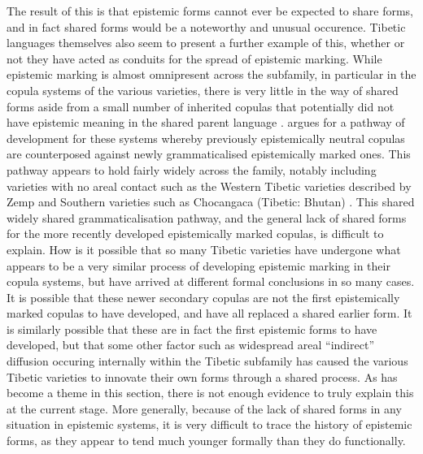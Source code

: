 The result of this is that epistemic forms cannot ever be expected to share forms, and in fact shared forms would be a noteworthy and unusual occurence. Tibetic languages themselves also seem to present a further example of this, whether or not they have acted as conduits for the spread of epistemic marking. While epistemic marking is almost omnipresent across the subfamily, in particular in the copula systems of the various varieties, there is very little in the way of shared forms aside from a small number of inherited copulas that potentially did not have epistemic meaning in the shared parent language \cites{Hill2017}{Zeisler2018}{Zemp2020}.  argues for a pathway of development for these systems whereby previously epistemically neutral copulas are counterposed against newly grammaticalised epistemically marked ones. This pathway appears to hold fairly widely across the family, notably including varieties with no areal contact such as the Western Tibetic varieties described by Zemp and Southern varieties such as Chocangaca (Tibetic: Bhutan) \cite{Bodnaruk2023a}. This shared widely shared grammaticalisation pathway, and the general lack of shared forms for the more recently developed epistemically marked copulas, is difficult to explain. How is it possible that so many Tibetic varieties have undergone what appears to be a very similar process of developing epistemic marking in their copula systems, but have arrived at different formal conclusions in so many cases. It is possible that these newer secondary copulas are not the first epistemically marked copulas to have developed, and have all replaced a shared earlier form. It is similarly possible that these are in fact the first epistemic forms to have developed, but that some other factor such as widespread areal ``indirect'' diffusion occuring internally within the Tibetic subfamily has caused the various Tibetic varieties to innovate their own forms through a shared process. As has become a theme in this section, there is not enough evidence to truly explain this at the current stage. More generally, because of the lack of shared forms in any situation in epistemic systems, it is very difficult to trace the history of epistemic forms, as they appear to tend much younger formally than they do functionally.

